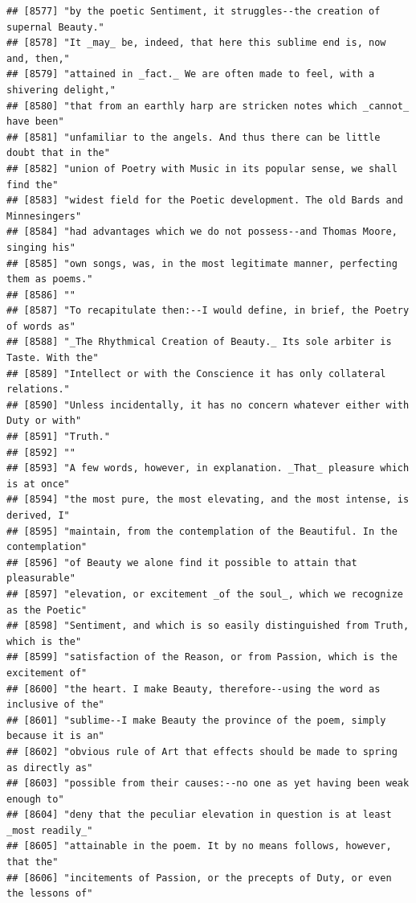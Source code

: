\documentclass{article}\usepackage[]{graphicx}\usepackage[]{color}
\makeatletter
\newenvironment{kframe}{%
 \def\at@end@of@kframe{}%
 \ifinner\ifhmode%
  \def\at@end@of@kframe{\end{minipage}}%
  \begin{minipage}{\columnwidth}%
 \fi\fi%
 \def\FrameCommand##1{\hskip\@totalleftmargin \hskip-\fboxsep
 \colorbox{shadecolor}{##1}\hskip-\fboxsep
     \hskip-\linewidth \hskip-\@totalleftmargin \hskip\columnwidth}%
 \MakeFramed {\advance\hsize-\width
   \@totalleftmargin\z@ \linewidth\hsize
   \@setminipage}}%
 {\par\unskip\endMakeFramed%
 \at@end@of@kframe}
\newenvironment{knitrout}{}{} %
\makeatother
\begin{document}
\begin{knitrout}
\begin{kframe}
\begin{verbatim}
## [8577] "by the poetic Sentiment, it struggles--the creation of supernal Beauty."     
## [8578] "It _may_ be, indeed, that here this sublime end is, now and, then,"          
## [8579] "attained in _fact._ We are often made to feel, with a shivering delight,"    
## [8580] "that from an earthly harp are stricken notes which _cannot_ have been"       
## [8581] "unfamiliar to the angels. And thus there can be little doubt that in the"    
## [8582] "union of Poetry with Music in its popular sense, we shall find the"          
## [8583] "widest field for the Poetic development. The old Bards and Minnesingers"     
## [8584] "had advantages which we do not possess--and Thomas Moore, singing his"       
## [8585] "own songs, was, in the most legitimate manner, perfecting them as poems."    
## [8586] ""                                                                            
## [8587] "To recapitulate then:--I would define, in brief, the Poetry of words as"     
## [8588] "_The Rhythmical Creation of Beauty._ Its sole arbiter is Taste. With the"    
## [8589] "Intellect or with the Conscience it has only collateral relations."          
## [8590] "Unless incidentally, it has no concern whatever either with Duty or with"    
## [8591] "Truth."                                                                      
## [8592] ""                                                                            
## [8593] "A few words, however, in explanation. _That_ pleasure which is at once"      
## [8594] "the most pure, the most elevating, and the most intense, is derived, I"      
## [8595] "maintain, from the contemplation of the Beautiful. In the contemplation"     
## [8596] "of Beauty we alone find it possible to attain that pleasurable"              
## [8597] "elevation, or excitement _of the soul_, which we recognize as the Poetic"    
## [8598] "Sentiment, and which is so easily distinguished from Truth, which is the"    
## [8599] "satisfaction of the Reason, or from Passion, which is the excitement of"     
## [8600] "the heart. I make Beauty, therefore--using the word as inclusive of the"     
## [8601] "sublime--I make Beauty the province of the poem, simply because it is an"    
## [8602] "obvious rule of Art that effects should be made to spring as directly as"    
## [8603] "possible from their causes:--no one as yet having been weak enough to"       
## [8604] "deny that the peculiar elevation in question is at least _most readily_"     
## [8605] "attainable in the poem. It by no means follows, however, that the"           
## [8606] "incitements of Passion, or the precepts of Duty, or even the lessons of"     

\end{verbatim}
\end{kframe}
\end{knitrout}
\end{document}

